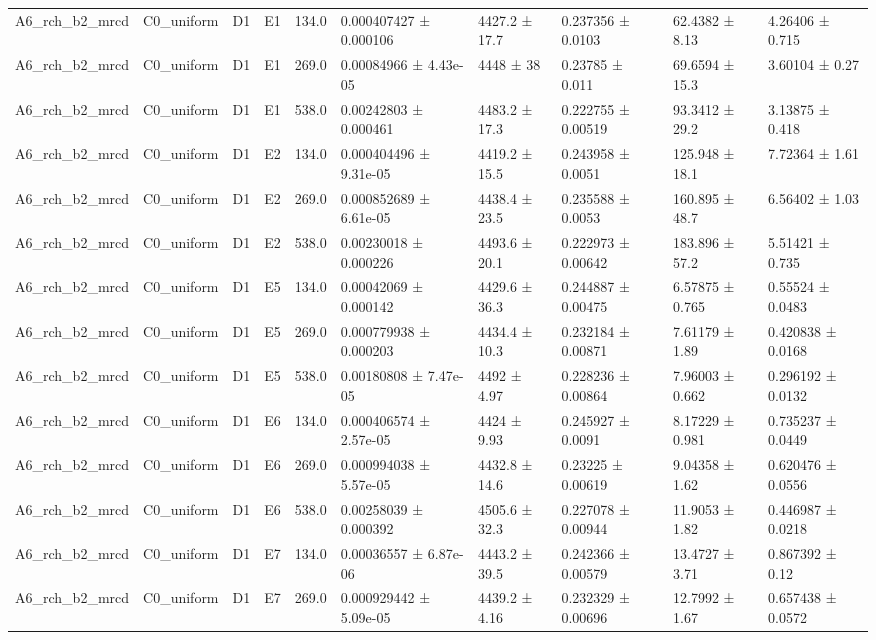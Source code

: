 \begin{table}
\begin{tabular}{llllllllll}
A6\_rch\_b2\_mrcd & C0\_uniform & D1 & E1 & 134.0 & 0.000407427 ± 0.000106 & 4427.2 ± 17.7 & 0.237356 ± 0.0103 & 62.4382 ± 8.13 & 4.26406 ± 0.715 \\
A6\_rch\_b2\_mrcd & C0\_uniform & D1 & E1 & 269.0 & 0.00084966 ± 4.43e-05 & 4448 ± 38 & 0.23785 ± 0.011 & 69.6594 ± 15.3 & 3.60104 ± 0.27 \\
A6\_rch\_b2\_mrcd & C0\_uniform & D1 & E1 & 538.0 & 0.00242803 ± 0.000461 & 4483.2 ± 17.3 & 0.222755 ± 0.00519 & 93.3412 ± 29.2 & 3.13875 ± 0.418 \\
A6\_rch\_b2\_mrcd & C0\_uniform & D1 & E2 & 134.0 & 0.000404496 ± 9.31e-05 & 4419.2 ± 15.5 & 0.243958 ± 0.0051 & 125.948 ± 18.1 & 7.72364 ± 1.61 \\
A6\_rch\_b2\_mrcd & C0\_uniform & D1 & E2 & 269.0 & 0.000852689 ± 6.61e-05 & 4438.4 ± 23.5 & 0.235588 ± 0.0053 & 160.895 ± 48.7 & 6.56402 ± 1.03 \\
A6\_rch\_b2\_mrcd & C0\_uniform & D1 & E2 & 538.0 & 0.00230018 ± 0.000226 & 4493.6 ± 20.1 & 0.222973 ± 0.00642 & 183.896 ± 57.2 & 5.51421 ± 0.735 \\
A6\_rch\_b2\_mrcd & C0\_uniform & D1 & E5 & 134.0 & 0.00042069 ± 0.000142 & 4429.6 ± 36.3 & 0.244887 ± 0.00475 & 6.57875 ± 0.765 & 0.55524 ± 0.0483 \\
A6\_rch\_b2\_mrcd & C0\_uniform & D1 & E5 & 269.0 & 0.000779938 ± 0.000203 & 4434.4 ± 10.3 & 0.232184 ± 0.00871 & 7.61179 ± 1.89 & 0.420838 ± 0.0168 \\
A6\_rch\_b2\_mrcd & C0\_uniform & D1 & E5 & 538.0 & 0.00180808 ± 7.47e-05 & 4492 ± 4.97 & 0.228236 ± 0.00864 & 7.96003 ± 0.662 & 0.296192 ± 0.0132 \\
A6\_rch\_b2\_mrcd & C0\_uniform & D1 & E6 & 134.0 & 0.000406574 ± 2.57e-05 & 4424 ± 9.93 & 0.245927 ± 0.0091 & 8.17229 ± 0.981 & 0.735237 ± 0.0449 \\
A6\_rch\_b2\_mrcd & C0\_uniform & D1 & E6 & 269.0 & 0.000994038 ± 5.57e-05 & 4432.8 ± 14.6 & 0.23225 ± 0.00619 & 9.04358 ± 1.62 & 0.620476 ± 0.0556 \\
A6\_rch\_b2\_mrcd & C0\_uniform & D1 & E6 & 538.0 & 0.00258039 ± 0.000392 & 4505.6 ± 32.3 & 0.227078 ± 0.00944 & 11.9053 ± 1.82 & 0.446987 ± 0.0218 \\
A6\_rch\_b2\_mrcd & C0\_uniform & D1 & E7 & 134.0 & 0.00036557 ± 6.87e-06 & 4443.2 ± 39.5 & 0.242366 ± 0.00579 & 13.4727 ± 3.71 & 0.867392 ± 0.12 \\
A6\_rch\_b2\_mrcd & C0\_uniform & D1 & E7 & 269.0 & 0.000929442 ± 5.09e-05 & 4439.2 ± 4.16 & 0.232329 ± 0.00696 & 12.7992 ± 1.67 & 0.657438 ± 0.0572 \\

\end{tabular}
\end{table}
